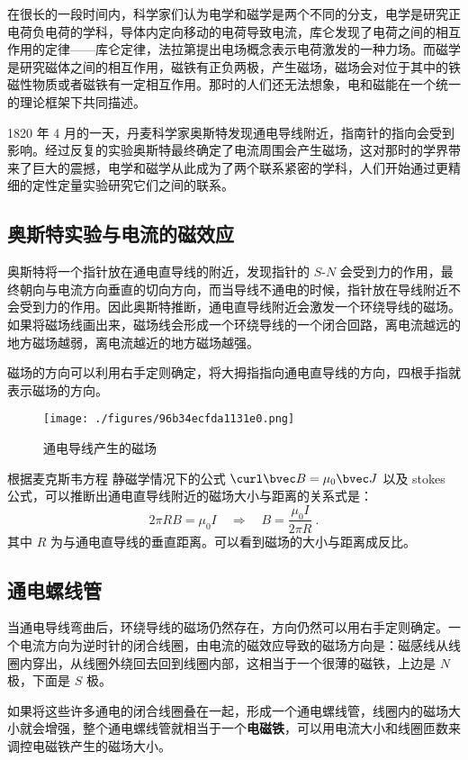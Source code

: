 

在很长的一段时间内，科学家们认为电学和磁学是两个不同的分支，电学是研究正电荷负电荷的学科，导体内定向移动的电荷导致电流，库仑发现了电荷之间的相互作用的定律——库仑定律，法拉第提出电场概念表示电荷激发的一种力场。而磁学是研究磁体之间的相互作用，磁铁有正负两极，产生磁场，磁场会对位于其中的铁磁性物质或者磁铁有一定相互作用。那时的人们还无法想象，电和磁能在一个统一的理论框架下共同描述。

1820 年 4 月的一天，丹麦科学家奥斯特发现通电导线附近，指南针的指向会受到影响。经过反复的实验奥斯特最终确定了电流周围会产生磁场，这对那时的学界带来了巨大的震撼，电学和磁学从此成为了两个联系紧密的学科，人们开始通过更精细的定性定量实验研究它们之间的联系。
\subsection{奥斯特实验与电流的磁效应}
奥斯特将一个指针放在通电直导线的附近，发现指针的 $S$-$N$ 会受到力的作用，最终朝向与电流方向垂直的切向方向，而当导线不通电的时候，指针放在导线附近不会受到力的作用。因此奥斯特推断，通电直导线附近会激发一个环绕导线的磁场。如果将磁场线画出来，磁场线会形成一个环绕导线的一个闭合回路，离电流越远的地方磁场越弱，离电流越近的地方磁场越强。

磁场的方向可以利用右手定则确定，将大拇指指向通电直导线的方向，四根手指就表示磁场的方向。

\begin{figure}[ht]
\centering
\texttt{[image: ./figures/96b34ecfda1131e0.png]}
\caption{通电导线产生的磁场} \label{fig_CurMag_1}
\end{figure}

根据麦克斯韦方程 静磁学情况下的公式 $\curl \bvec B=\mu_0 \bvec J$ 以及 stokes 公式，可以推断出通电直导线附近的磁场大小与距离的关系式是：
\begin{equation}
2\pi R B = \mu_0 I\quad \Rightarrow\quad B=\frac{\mu_0 I }{2\pi R}~.
\end{equation}
其中 $R$ 为与通电直导线的垂直距离。可以看到磁场的大小与距离成反比。
\subsection{通电螺线管}
当通电导线弯曲后，环绕导线的磁场仍然存在，方向仍然可以用右手定则确定。一个电流方向为逆时针的闭合线圈，由电流的磁效应导致的磁场方向是：磁感线从线圈内穿出，从线圈外绕回去回到线圈内部，这相当于一个很薄的磁铁，上边是 $N$ 极，下面是 $S$ 极。

如果将这些许多通电的闭合线圈叠在一起，形成一个通电螺线管，线圈内的磁场大小就会增强，整个通电螺线管就相当于一个\textbf{电磁铁}，可以用电流大小和线圈匝数来调控电磁铁产生的磁场大小。